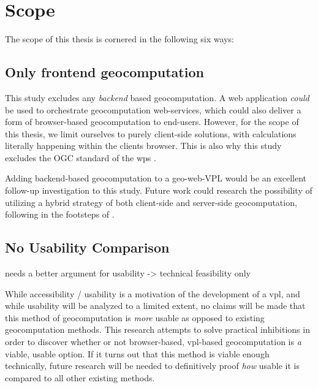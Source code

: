 \newpage
\section{Scope}
The scope of this thesis is cornered in the following six ways: 

\subsection*{Only frontend geocomputation}
This study excludes any \emph {backend} based geocomputation.
A web application \textit{could} be used to orchestrate geocomputation web-services, which could also deliver a form of browser-based geocomputation to end-users. 
However, for the scope of this thesis, we limit ourselves to purely client-side solutions, with calculations literally happening within the clients browser. 
This is also why this study excludes the OGC standard of the \ac{wps} \cite{ogc_web_2015}.

Adding backend-based geocomputation to a geo-web-VPL would be an excellent follow-up investigation to this study. 
Future work could research the possibility of utilizing a hybrid strategy of both client-side and server-side geocomputation, following in the footsteps of \cite{panidi_hybrid_2015}. 

\subsection*{No Usability Comparison} %
\begin{note}
  needs a better argument for usability -> technical feasibility only
\end{note}

While accessibility / usability is a motivation of the development of a \ac{vpl}, and while usability will be analyzed to a limited extent, no claims will be made that this method of geocomputation is \emph{more} usable as opposed to existing geocomputation methods. This research attempts to solve practical inhibitions in order to discover whether or not browser-based, vpl-based geocomputation is \emph{a} viable, usable option. If it turns out that this method is viable enough technically, future research will be needed to definitively proof \emph{how} usable it is compared to all other existing methods.  


